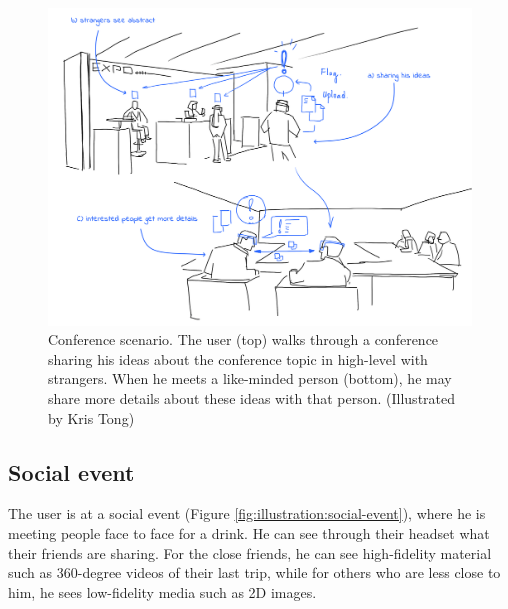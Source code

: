 \begin{figure}[ht]
    \centering
    \includegraphics[width=0.8\linewidth]{images/30-continuum/illustrations/4_Flag_On_Conference.png}
    \caption{Conference scenario. The user (top) walks through a conference sharing his ideas about the conference topic in high-level with strangers. When he meets a like-minded person (bottom), he may share more details about these ideas with that person. (Illustrated by Kris Tong)}
    \label{fig:illustration:conference}
\end{figure}

\subsection{Social event}

The user is at a social event (Figure \ref{fig:illustration:social-event}), where he is meeting people face to face for a drink. He can see through their headset what their friends are sharing. For the close friends, he can see high-fidelity material such as 360-degree videos of their last trip, while for others who are less close to him, he sees low-fidelity media such as 2D images. 

